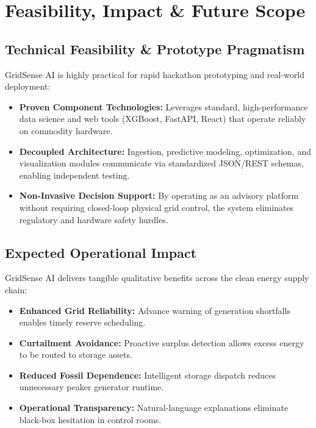 \section{Feasibility, Impact \& Future Scope}
\label{sec:feasibility_impact}

\subsection{Technical Feasibility \& Prototype Pragmatism}
\label{subsec:feasibility}

GridSense AI is highly practical for rapid hackathon prototyping and real-world deployment:
\begin{itemize}[leftmargin=1.5em, itemsep=0.2em]
    \item \textbf{Proven Component Technologies:} Leverages standard, high-performance data science and web tools (XGBoost, FastAPI, React) that operate reliably on commodity hardware.
    \item \textbf{Decoupled Architecture:} Ingestion, predictive modeling, optimization, and visualization modules communicate via standardized JSON/REST schemas, enabling independent testing.
    \item \textbf{Non-Invasive Decision Support:} By operating as an advisory platform without requiring closed-loop physical grid control, the system eliminates regulatory and hardware safety hurdles.
\end{itemize}

\subsection{Expected Operational Impact}
\label{subsec:expected_impact}

GridSense AI delivers tangible qualitative benefits across the clean energy supply chain:
\begin{itemize}[leftmargin=1.5em, itemsep=0.2em]
    \item \textbf{Enhanced Grid Reliability:} Advance warning of generation shortfalls enables timely reserve scheduling.
    \item \textbf{Curtailment Avoidance:} Proactive surplus detection allows excess energy to be routed to storage assets.
    \item \textbf{Reduced Fossil Dependence:} Intelligent storage dispatch reduces unnecessary peaker generator runtime.
    \item \textbf{Operational Transparency:} Natural-language explanations eliminate black-box hesitation in control rooms.
\end{itemize}

